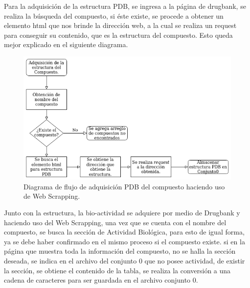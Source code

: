\noindent Para la adquisición de la estructura PDB, se ingresa a la página de drugbank, se realiza la búsqueda del compuesto, si éste existe, se procede a obtener un elemento html que  nos brinde la  dirección  web, a la cual se realiza un  request para conseguir su contenido, que es la estructura del compuesto. Esto queda mejor explicado en el siguiente diagrama.\\

\begin{figure}[H]
    \centering
    \includegraphics[scale=0.70]{Capitulo4/Documentos/imagenes_entorno/figura_flujo.png}
    \caption{Diagrama de flujo de adquisición PDB del compuesto haciendo uso de Web Scrapping.}
    \label{Diagrama_de_flujo_1}
\end{figure}

\noindent Junto con la estructura, la bio-actividad se adquiere por medio de  Drugbank y haciendo uso del Web Scrapping, una vez que se cuenta con el nombre del compuesto, se busca la sección de Actividad Biológica, para esto  de igual forma, ya se debe haber confirmado en el mismo proceso si el compuesto  existe. si en la página que muestra toda la información del compuesto, no se halla la sección deseada, se indica en  el archivo del conjunto 0 que no posee actividad, de existir la sección, se obtiene el contenido de la tabla, se realiza la conversión a una cadena de caracteres para ser guardada en el archivo  conjunto 0.

